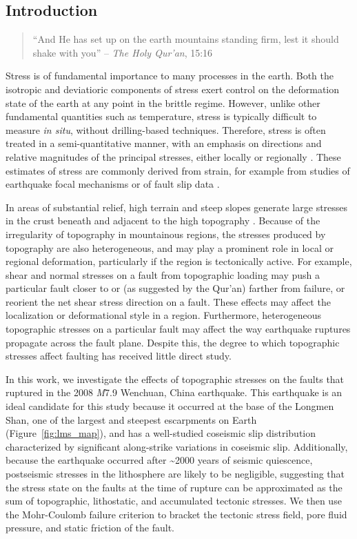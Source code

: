 \documentclass[twocolumn,jgrga]{AGUTeX}
\begin{document}
\begin{article}
\section{Introduction}\label{introduction}

\begin{quote}
``And He has set up on the earth mountains standing firm, lest it should
shake with you'' -- \emph{The Holy Qur'an}, 15:16
\end{quote}

Stress is of fundamental importance to many processes in the earth. Both
the isotropic and deviatioric components of stress
exert control on the deformation state of the earth at any point in the
brittle regime. However, unlike other fundamental quantities such as
temperature, stress is typically difficult to measure \emph{in situ},
without drilling-based techniques. Therefore, stress is often treated in
a semi-quantitative manner, with an emphasis on directions and relative
magnitudes of the principal stresses, either locally or regionally
\citep[e.g.,][]{angelier1994}. These estimates of stress are commonly
derived from strain, for example from studies of earthquake focal
mechanisms \citep[e.g.,][]{michael1987} or of fault slip data
\citep[e.g.,][]{reches1987, medinaluna2013}.

In areas of substantial relief, high terrain and steep slopes generate
large stresses in the crust beneath and adjacent to the high topography
\citep{jeffreys1924, coblentz1996}. Because of the irregularity of
topography in mountainous regions, the stresses produced by topography
are also heterogeneous, and may play a prominent role in local or
regional deformation, particularly if the region is tectonically active.
For example, shear and normal stresses on a fault from topographic
loading may push a particular fault closer to or (as suggested by the
Qur'an) farther from failure, or reorient the net shear stress direction
on a fault. These effects may affect the localization or deformational
style in a region. Furthermore, heterogeneous topographic stresses on a
particular fault may affect the way earthquake ruptures propagate across
the fault plane. Despite this, the degree to which topographic stresses
affect faulting has received little direct study.

In this work, we investigate the effects of topographic stresses on the
faults that ruptured in the 2008 \emph{M}7.9 Wenchuan, China earthquake.
This earthquake is an ideal candidate for this study because it occurred at
the base of the Longmen Shan, one of the largest and steepest
escarpments on Earth (Figure~\ref{fig:lms_map}), and has a well-studied
coseismic slip distribution characterized by significant along-strike
variations in coseismic slip. Additionally, because the earthquake
occurred after \textasciitilde{}2000 years of seismic quiescence,
postseismic stresses in the lithosphere are likely to be negligible,
suggesting that the stress state on the faults at the time of rupture
can be approximated as the sum of topographic, lithostatic, and
accumulated tectonic stresses. We then use the Mohr-Coulomb failure
criterion to bracket the tectonic stress field, pore fluid pressure, and
static friction of the fault.


\end{article}
\end{document}
